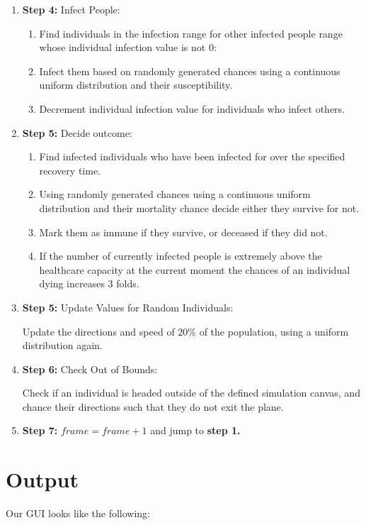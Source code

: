 \documentclass[11pt]{article}
\begin{document}
\begin{enumerate}[label=\textbf{\arabic*})]
    \item \textbf{Step 4:} Infect People:
    \begin{enumerate}
        \item Find individuals in the infection range for other infected people range whose individual infection value is not 0: 
        \item Infect them based on randomly generated chances using a continuous uniform distribution and their susceptibility.
        \item Decrement individual infection value for individuals who infect others.
    \end{enumerate}
    \item \textbf{Step 5:} Decide outcome:
    \begin{enumerate}
        \item Find infected individuals who have been infected for over the specified recovery time.
        \item Using randomly generated chances using a continuous uniform distribution and their mortality chance decide either they survive for not.
        \item Mark them as immune if they survive, or deceased if they did not.
        \item If the number of currently infected people is extremely above the healthcare capacity at the current moment the chances of an individual dying increases 3 folds.
    \end{enumerate}
    \item \textbf{Step 5:} Update Values for Random Individuals:
    
    Update the directions and speed of 20\% of the population, using a uniform distribution again.
    
    \item \textbf{Step 6:} Check Out of Bounds:
    
    Check if an individual is headed outside of the defined simulation canvas, and chance their directions such that they do not exit the plane.
    
    \item \textbf{Step 7:} $frame = frame + 1$ and jump to \textbf{step 1.}
\end{enumerate}


\section{Output} 
Our GUI looks like the following:
\end{document}
